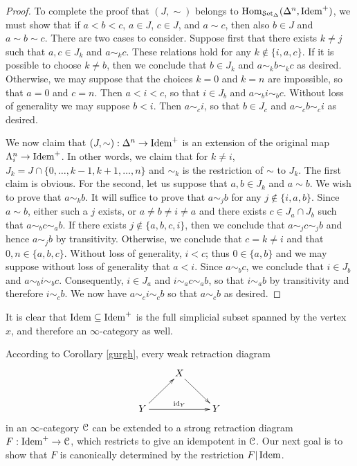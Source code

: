 \begin{proof}
To complete the proof that $(J, \sim)$ belongs to $\operatorname{Hom}_{\operatorname{\mathcal{S}et_{\Delta}}}(\Delta^n, \operatorname{Idem}^{+})$, we must
show that if $a < b < c$, $a \in J$, $c \in J$, and $a \sim c$, then also $b \in J$ and
$a \sim b \sim c$. There are two cases to consider. Suppose first that there exists $k \neq j$ such that $a,c \in J_{k}$ and $a \sim_{k} c$. These relations hold for any $k \notin \{i,a,c\}$. If it is possible to choose $k \neq b$, then we conclude that $b \in J_{k}$ and $a \sim_{k} b \sim_{k} c$ as desired. 
Otherwise, we may suppose that the choices $k=0$ and $k=n$ are impossible, so that
$a = 0$ and $c = n$. Then $a < i < c$, so that $i \in J_{b}$ and $a \sim_{b} i \sim_{b} c$.
Without loss of generality we may suppose $b < i$. Then $a \sim_{c} i$, so that $b \in J_{c}$
and $a \sim_{c} b \sim_{c} i$ as desired. 

We now claim that $(J,\sim): \Delta^n \rightarrow \operatorname{Idem}^{+}$ is an extension of the original
map $\Lambda^n_i \rightarrow \operatorname{Idem}^{+}$. In other words, we claim that for $k \neq i$, 
$J_{k} = J \cap \{0, \ldots, k-1, k+1, \ldots, n\}$ and $\sim_{k}$ is the restriction of $\sim$ to
$J_{k}$. The first claim is obvious. For the second, let us suppose that $a,b \in J_{k}$ and
$a \sim b$. We wish to prove that $a \sim_{k} b$. It will suffice to prove that $a \sim_{j} b$ for any
$j \notin \{i, a, b\}$. Since $a \sim b$, either such a $j$ exists, or $a \neq b \neq i \neq a$
and there exists $c \in J_{a} \cap J_{b}$ such that $a \sim_{b} c \sim_{a} b$. If there exists
$j \notin \{a,b,c,i\}$, then we conclude that $a \sim_{j} c \sim_{j} b$ and hence $a \sim_{j} b$
by transitivity. Otherwise, we conclude that $c = k \neq i$ and that $0,n \in \{a,b,c\}$. 
Without loss of generality, $i < c$; thus $0 \in \{a,b\}$ and we may suppose without loss of generality that $a < i$. Since $a \sim_{b} c$, we conclude that $i \in J_{b}$ 
and $a \sim_{b} i \sim_{b} c$. Consequently,
$i \in J_{a}$ and $i \sim_{a} c \sim_{a} b$, so that $i \sim_{a} b$ by transitivity
and therefore $i \sim_{c} b$. We now have $a \sim_{c} i \sim_{c} b$ so that $a \sim_{c} b$
as desired.
\end{proof}

\begin{remark}
It is clear that $\operatorname{Idem} \subseteq \operatorname{Idem}^{+}$ is the full simplicial subset spanned by the vertex $x$, and therefore an $\infty$-category as well.
\end{remark}

According to Corollary \ref{gurgh}, every weak retraction diagram
$$ \xymatrix{ & X \ar[dr] & \\
Y \ar[ur] \ar[rr]^{\id_{Y}} & & Y }$$
in an $\infty$-category $\operatorname{\mathcal{C}}$ can be extended to a strong retraction diagram $F: \operatorname{Idem}^{+} \rightarrow \operatorname{\mathcal{C}}$, which restricts to give an idempotent in $\operatorname{\mathcal{C}}$. Our next goal is to show that
$F$ is canonically determined by the restriction $F| \operatorname{Idem}$.

